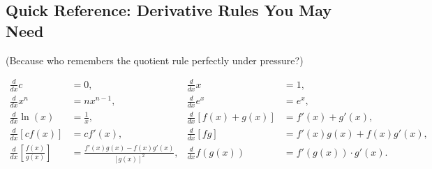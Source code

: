 \documentclass[11pt,letterpaper]{exam}
\begin{document}
\subsection*{Quick Reference: Derivative Rules You May Need} (Because who remembers the quotient rule perfectly under pressure?)

\begin{align*}
\frac{d}{dx} c &= 0, & \frac{d}{dx} x &= 1, \\
\frac{d}{dx} x^n &= n x^{n-1}, & \frac{d}{dx} e^x &= e^x, \\
\frac{d}{dx} \ln(x) &= \frac{1}{x}, & \frac{d}{dx}[f(x)+g(x)] &= f'(x) + g'(x), \\
\frac{d}{dx}[cf(x)] &= c f'(x), & \frac{d}{dx}[fg] &= f'(x)g(x) + f(x)g'(x), \\
\frac{d}{dx}\!\left[\frac{f(x)}{g(x)}\right] &= \frac{f'(x)g(x) - f(x)g'(x)}{[g(x)]^2}, & 
\frac{d}{dx} f(g(x)) &= f'(g(x)) \cdot g'(x).
\end{align*}
\end{document}
